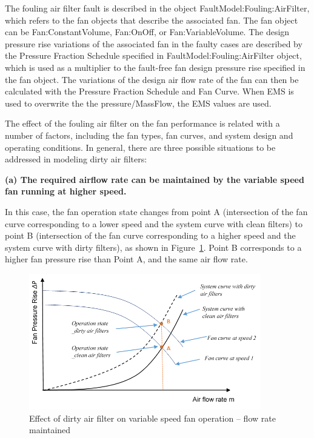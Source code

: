 The fouling air filter fault is described in the object FaultModel:Fouling:AirFilter, which refers to the fan objects that describe the associated fan. The fan object can be Fan:ConstantVolume, Fan:OnOff, or Fan:VariableVolume. The design pressure rise variations of the associated fan in the faulty cases are described by the Pressure Fraction Schedule specified in FaultModel:Fouling:AirFilter object, which is used as a multiplier to the fault-free fan design pressure rise specified in the fan object. The variations of the design air flow rate of the fan can then be calculated with the Pressure Fraction Schedule and Fan Curve. When EMS is used to overwrite the the pressure/MassFlow, the EMS values are used.

The effect of the fouling air filter on the fan performance is related with a number of factors, including the fan types, fan curves, and system design and operating conditions. In general, there are three possible situations to be addressed in modeling dirty air filters:

\textbf{(a) The required airflow rate can be maintained by the variable speed fan running at higher speed.}

In this case, the fan operation state changes from point A (intersection of the fan curve corresponding to a lower speed and the system curve with clean filters) to point B (intersection of the fan curve corresponding to a higher speed and the system curve with dirty filters), as shown in Figure~\ref{fig:effect-of-dirty-air-filter-on-variable-speed}. Point B corresponds to a higher fan pressure rise than Point A, and the same air flow rate.

\begin{figure}[hbtp] %
\centering
\includegraphics[width=0.9\textwidth, height=0.9\textheight, keepaspectratio=true]{media/image8006.png}
\caption{Effect of dirty air filter on variable speed fan operation – flow rate maintained \protect \label{fig:effect-of-dirty-air-filter-on-variable-speed}}
\end{figure}

